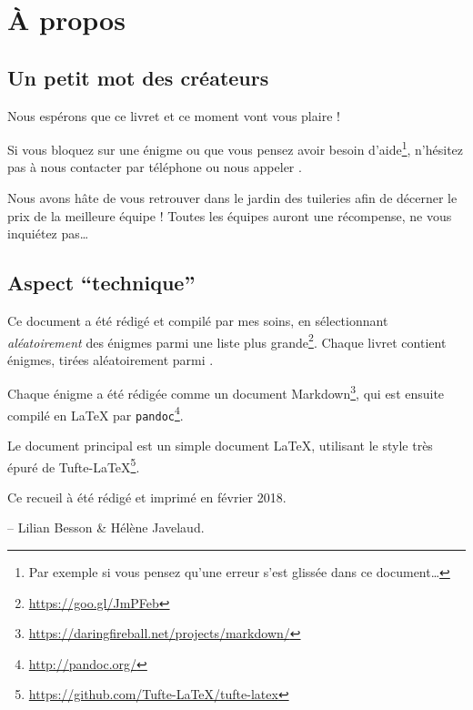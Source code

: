 \chapter{À propos}

\section*{Un petit mot des créateurs}

Nous espérons que ce livret et ce moment vont vous plaire !

Si vous bloquez sur une énigme ou que vous pensez avoir besoin d'aide\footnote{Par exemple si vous pensez qu'une erreur s'est glissée dans ce document…}, n'hésitez pas à nous contacter par téléphone ou nous appeler
.

Nous avons hâte de vous retrouver dans le jardin des tuileries afin de décerner le prix de la meilleure équipe !
Toutes les équipes auront une récompense, ne vous inquiétez pas…


\section*{Aspect ``technique''}
Ce document a été rédigé et compilé par mes soins, en sélectionnant \emph{aléatoirement} des énigmes parmi une liste plus grande\footnote{\url{https://goo.gl/JmPFeb}}.
Chaque livret contient \nbenigmes{} énigmes, tirées aléatoirement parmi \totalnbenigmes.

Chaque énigme a été rédigée comme un document Markdown\footnote{\url{https://daringfireball.net/projects/markdown/}},
qui est ensuite compilé en \LaTeX{} par \texttt{pandoc}\footnote{\url{http://pandoc.org/}}.

Le document principal est un simple document \LaTeX,
utilisant le style très épuré de Tufte-\LaTeX{}\footnote{\url{https://github.com/Tufte-LaTeX/tufte-latex}}.

Ce recueil à été rédigé et imprimé en février 2018.

-- Lilian Besson \& Hélène Javelaud.